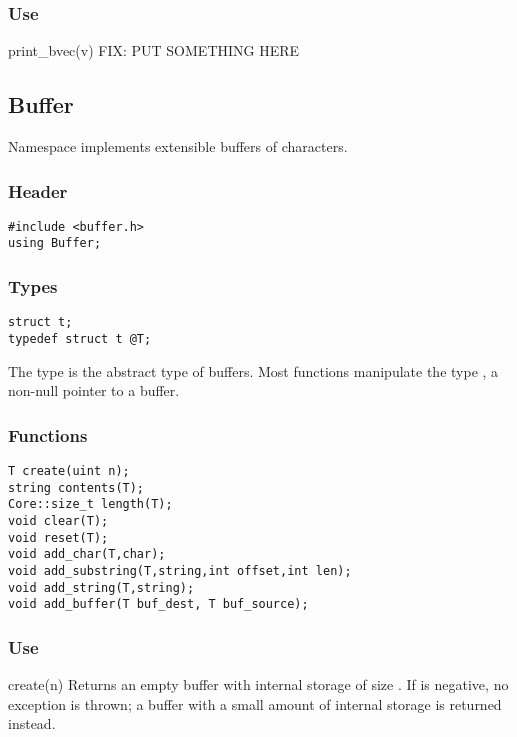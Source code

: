 \subsubsection*{Use}

\begin{defun}{print_bvec}{(v)}
FIX: PUT SOMETHING HERE
\end{defun}

\subsection{Buffer}

Namespace  implements extensible buffers of characters.

\subsubsection*{Header}
\begin{verbatim}
#include <buffer.h>
using Buffer;
\end{verbatim}

\subsubsection*{Types}
\begin{verbatim}
struct t;
typedef struct t @T;
\end{verbatim}

The type  is the abstract type of buffers.  Most
functions manipulate the type , a non-null pointer to a buffer.

\subsubsection*{Functions}
\begin{verbatim}
T create(uint n);
string contents(T);
Core::size_t length(T);
void clear(T);
void reset(T);
void add_char(T,char);
void add_substring(T,string,int offset,int len);
void add_string(T,string);
void add_buffer(T buf_dest, T buf_source);
\end{verbatim}

\subsubsection*{Use}

\begin{defun}{create}{(n)}
Returns an empty buffer with internal storage of size .  If
 is negative, no exception is thrown; a buffer with a small
amount of internal storage is returned instead.
\end{defun}

